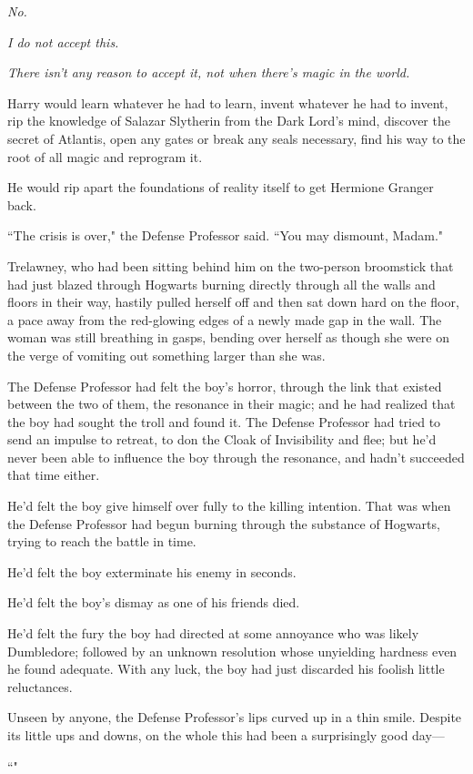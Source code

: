 \emph{No.}

\emph{I do not accept this.}

\emph{There isn't any reason to accept it, not when there's magic in the world.}

Harry would learn whatever he had to learn, invent whatever he had to invent, rip the knowledge of Salazar Slytherin from the Dark Lord's mind, discover the secret of Atlantis, open any gates or break any seals necessary, find his way to the root of all magic and reprogram it.

He would rip apart the foundations of reality itself to get Hermione Granger back.

\later

``The crisis is over," the Defense Professor said. ``You may dismount, Madam."

Trelawney, who had been sitting behind him on the two-person broomstick that had just blazed through Hogwarts burning directly through all the walls and floors in their way, hastily pulled herself off and then sat down hard on the floor, a pace away from the red-glowing edges of a newly made gap in the wall. The woman was still breathing in gasps, bending over herself as though she were on the verge of vomiting out something larger than she was.

The Defense Professor had felt the boy's horror, through the link that existed between the two of them, the resonance in their magic; and he had realized that the boy had sought the troll and found it. The Defense Professor had tried to send an impulse to retreat, to don the Cloak of Invisibility and flee; but he'd never been able to influence the boy through the resonance, and hadn't succeeded that time either.

He'd felt the boy give himself over fully to the killing intention. That was when the Defense Professor had begun burning through the substance of Hogwarts, trying to reach the battle in time.

He'd felt the boy exterminate his enemy in seconds.

He'd felt the boy's dismay as one of his friends died.

He'd felt the fury the boy had directed at some annoyance who was likely Dumbledore; followed by an unknown resolution whose unyielding hardness even he found adequate. With any luck, the boy had just discarded his foolish little reluctances.

Unseen by anyone, the Defense Professor's lips curved up in a thin smile. Despite its little ups and downs, on the whole this had been a surprisingly good day—

``"

